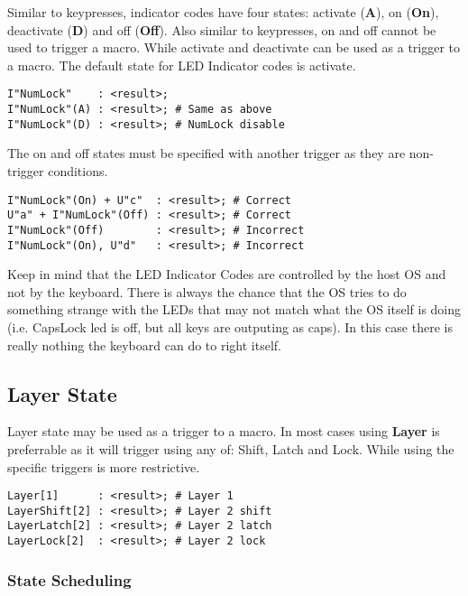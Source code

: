 \documentclass{kiibohd-template}
\begin{document}
Similar to keypresses, indicator codes have four states: activate (\textbf{A}), on (\textbf{On}), deactivate (\textbf{D}) and off (\textbf{Off}).
Also similar to keypresses, on and off cannot be used to trigger a macro.
While activate and deactivate can be used as a trigger to a macro.
The default state for LED Indicator codes is activate.

\begin{lstlisting}
I"NumLock"    : <result>;
I"NumLock"(A) : <result>; # Same as above
I"NumLock"(D) : <result>; # NumLock disable
\end{lstlisting}

The on and off states must be specified with another trigger as they are non-trigger conditions.

\begin{lstlisting}
I"NumLock"(On) + U"c"  : <result>; # Correct
U"a" + I"NumLock"(Off) : <result>; # Correct
I"NumLock"(Off)        : <result>; # Incorrect
I"NumLock"(On), U"d"   : <result>; # Incorrect
\end{lstlisting}

Keep in mind that the LED Indicator Codes are controlled by the host OS and not by the keyboard.
There is always the chance that the OS tries to do something strange with the LEDs that may not match what the OS itself is doing (i.e. CapsLock led is off, but all keys are outputing as caps).
In this case there is really nothing the keyboard can do to right itself.


\subsection{Layer State}
\label{subsec:Layer_State}

Layer state may be used as a trigger to a macro.
In most cases using \textbf{Layer} is preferrable as it will trigger using any of: Shift, Latch and Lock.
While using the specific triggers is more restrictive.

\begin{lstlisting}
Layer[1]      : <result>; # Layer 1
LayerShift[2] : <result>; # Layer 2 shift
LayerLatch[2] : <result>; # Layer 2 latch
LayerLock[2]  : <result>; # Layer 2 lock
\end{lstlisting}


\subsubsection{State Scheduling}
\end{document}
